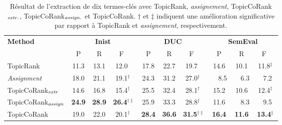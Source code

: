         \begin{table}[h!]
          \centering
            \begin{tabular}{l|ccc@{}|ccc@{}|ccc@{~}}
              \toprule
              \multirow{2}{*}{\textbf{Method}} & \multicolumn{3}{c|}{\textbf{Inist}} & \multicolumn{3}{c|}{\textbf{DUC}} & \multicolumn{3}{c}{\textbf{SemEval}}\\
              \cline{2-10}
              & P & R & F$^{~~~~}$ & P & R & F$^{~~~~}$ & P & R & F$^{~~}$\\
              \hline
              TopicRank & 11.3 & 13.1 & 12.0$^{~~~~}$ & 17.8 & 22.7 & 19.7$^{~~~~}$ & 14.6 & 10.1 & 11.8$^{\ddagger}$\\
              \textit{Assignment} & 18.0 & 21.1 & 19.1$^{\dagger~~}$ & 24.3 & 31.2 & 27.0$^{\dagger~~}$ & ~~8.5 & ~~6.3 & ~~7.2$^{~~}$\\
              \hline
              TopicCoRank$_\textnormal{\textit{extr}}$ & 14.6 & 16.8 & 15.4$^{\dagger~~}$ & 25.5 & 32.4 & 28.1$^{\dagger~~}$ & 15.2 & 10.6 & 12.4$^{\ddagger}$\\
              TopicCoRank$_\textnormal{\textit{assign}}$ & \textbf{24.9} & \textbf{28.9} & \textbf{26.4$^{\dagger\ddagger}$} & 25.9 & 33.3 & 28.8$^{\dagger~~}$ & 11.6 & ~~8.3 & ~~9.5$^{~~}$\\
              \hline
              TopicCoRank & 19.0 & 22.0 & 20.1$^{\dagger~~}$ & \textbf{28.4} & \textbf{36.6} & \textbf{31.5$^{\dagger\ddagger}$} & \textbf{16.4} & \textbf{11.6} & \textbf{13.4$^{\ddagger}$}\\
              \bottomrule
            \end{tabular}
        \caption[
          Résultat de l'extraction de dix termes-clés avec TopicRank,
          \textit{assignement}, TopicCoRank$_\textnormal{\textit{extr.}}$,
          TopicCoRank$_\textnormal{\textit{assign.}}$ et TopicCoRank
        ]{
          Résultat de l'extraction de dix termes-clés avec TopicRank,
          \textit{assignement}, TopicCoRank$_\textnormal{\textit{extr.}}$,
          TopicCoRank$_\textnormal{\textit{assign.}}$ et TopicCoRank. $\dagger$
          et $\ddagger$ indiquent une amélioration significative par rapport à
          TopicRank et \textit{assignement}, respectivement.
          \label{tab:topiccorank-comparison_results}}
        \end{table}
        
